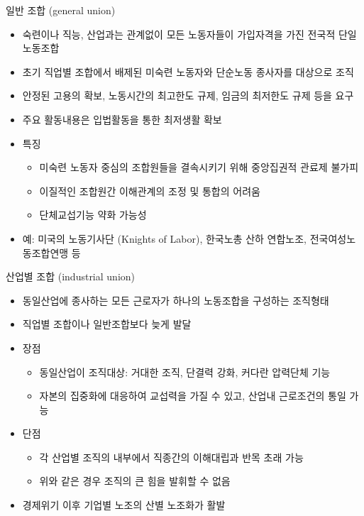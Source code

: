 \documentclass[aspectratio=169,xcolor=dvipsnames,handout]{beamer}
\begin{document}
\begin{frame}[allowframebreaks]{일반 조합 (general union)}
    \begin{itemize}[<+->]
        \item 숙련이나 직능, 산업과는 관계없이 모든 노동자들이 가입자격을 가진 전국적 단일노동조합
        \item 초기 직업별 조합에서 배제된 미숙련 노동자와 단순노동 종사자를 대상으로 조직
        \item 안정된 고용의 확보, 노동시간의 최고한도 규제, 임금의 최저한도 규제 등을 요구
        \item 주요 활동내용은 입법활동을 통한 최저생활 확보
        \framebreak\relax
        \item 특징
        \begin{itemize}[<+->]
            \item 미숙련 노동자 중심의 조합원들을 결속시키기 위해 중앙집권적 관료제 불가피
            \item 이질적인 조합원간 이해관계의 조정 및 통합의 어려움
            \item 단체교섭기능 약화 가능성
        \end{itemize}
        \item 예: 미국의 노동기사단 (Knights of Labor), 한국노총 산하 연합노조, 전국여성노동조합연맹 등
    \end{itemize}
\end{frame}

\begin{frame}{산업별 조합 (industrial union)}
    \begin{itemize}[<+->]
        \item 동일산업에 종사하는 모든 근로자가 하나의 노동조합을 구성하는 조직형태
        \item 직업별 조합이나 일반조합보다 늦게 발달
        \item 장점
        \begin{itemize}[<+->]
            \item 동일산업이 조직대상: 거대한 조직, 단결력 강화,  커다란 압력단체 기능
            \item 자본의 집중화에 대응하여 교섭력을 가질 수 있고, 산업내 근로조건의 통일 가능
        \end{itemize}
        \item 단점
        \begin{itemize}[<+->]
            \item 각 산업별 조직의 내부에서 직종간의 이해대립과 반목 초래 가능
            \item 위와 같은 경우 조직의 큰 힘을 발휘할 수 없음
        \end{itemize}
        \item 경제위기 이후 기업별 노조의 산별 노조화가 활발
    \end{itemize}
\end{frame}
\end{document}
